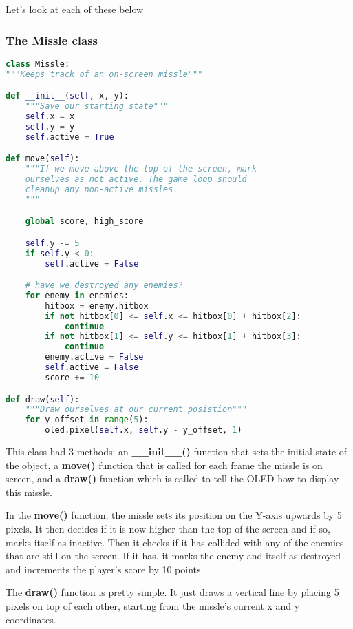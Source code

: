 Let's look at each of these below

\subsubsection{The Missle class}
\begin{lstlisting}[language=Python,caption=The Missle class]
class Missle:
"""Keeps track of an on-screen missle"""

def __init__(self, x, y):
    """Save our starting state"""
    self.x = x
    self.y = y
    self.active = True

def move(self):
    """If we move above the top of the screen, mark
    ourselves as not active. The game loop should
    cleanup any non-active missles.
    """

    global score, high_score

    self.y -= 5
    if self.y < 0:
        self.active = False

    # have we destroyed any enemies?
    for enemy in enemies:
        hitbox = enemy.hitbox
        if not hitbox[0] <= self.x <= hitbox[0] + hitbox[2]:
            continue
        if not hitbox[1] <= self.y <= hitbox[1] + hitbox[3]:
            continue
        enemy.active = False
        self.active = False
        score += 10

def draw(self):
    """Draw ourselves at our current posistion"""
    for y_offset in range(5):
        oled.pixel(self.x, self.y - y_offset, 1)
\end{lstlisting}

This class had 3 methods: an \textbf{\_\_init\_\_()} function that sets the initial state of the object,
a \textbf{move()} function that is called for each frame the missle is on screen, and a \textbf{draw()}
function which is called to tell the OLED how to display this missle.

In the \textbf{move()} function, the missle sets its position on the Y-axis upwards by 5 pixels. It then decides
if it is now higher than the top of the screen and if so, marks itself as inactive. Then it checks if it
has collided with any of the enemies that are still on the screen. If it has, it marks the enemy and
itself as destroyed and increments the player's score by 10 points.

The \textbf{draw()} function is pretty simple. It just draws a vertical line by placing 5 pixels on top of each
other, starting from the missle's current x and y coordinates.

